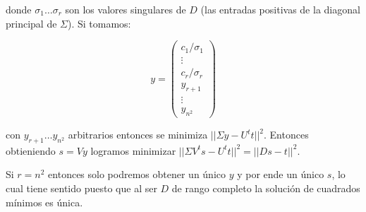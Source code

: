 \documentclass[a4paper]{article}
\begin{document}
\begin{itemize}
\noindent donde $\sigma_1 \ldots \sigma_r$ son los valores singulares de $D$ (las entradas positivas de la diagonal principal de $\Sigma$). Si 
tomamos:

\[
y = 
    \begin{pmatrix}
      c_1/\sigma_1 \\
      \vdots       \\
      c_r/\sigma_r \\
      y_{r+1}      \\
      \vdots       \\
      y_{n^2}      
    \end{pmatrix}
\]

\noindent con $y_{r+1} \ldots y_{n^2}$ arbitrarios entonces se minimiza $||\Sigma y - U^tt||^2$. Entonces obtieniendo $s = Vy$ logramos minimizar 
$||\Sigma V^t s - U^tt||^2 = ||Ds - t||^2$.

Si $r = n^2$ entonces solo podremos obtener un único $y$ y por ende un único $s$, lo cual tiene sentido puesto que al ser $D$ de rango completo 
la solución de cuadrados mínimos es única.

\end{itemize}


\end{document}
